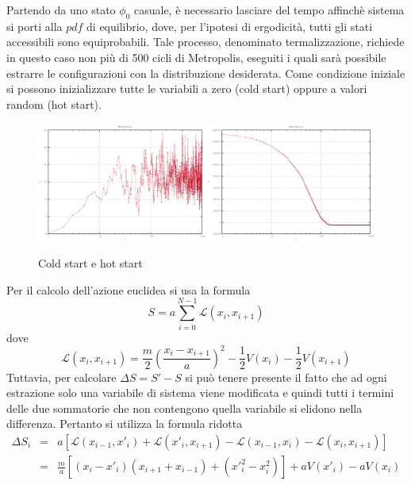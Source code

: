Partendo da uno stato $\phi_0$ casuale, è necessario lasciare del tempo affinchè sistema si porti alla $pdf$ di equilibrio, dove, per l'ipotesi di ergodicità, tutti gli stati accessibili sono equiprobabili. Tale processo, denominato termalizzazione, richiede in questo caso non più di 500 cicli di Metropolis, eseguiti i quali sarà possibile estrarre le configurazioni con la distribuzione desiderata. Come condizione iniziale si possono inizializzare tutte le variabili a zero (cold start) oppure a valori random (hot start).
\begin{figure}[H]
\centering
\includegraphics[width=0.5\textwidth]{action1}\includegraphics[width=0.5\textwidth]{action2}
\caption{Cold start e hot start}
\label{fig:action}
\end{figure}
Per il calcolo dell'azione euclidea si usa la formula
$$S = a\displaystyle\sum\limits_{i=0}^{N-1} \mathcal{L}(x_{i},x_{i+1})$$
dove
$$\mathcal{L}(x_{i},x_{i+1}) = \frac{m}{2}\left(\frac{x_{i}-x_{i+1}}{a}\right)^{2}-\frac{1}{2}V(x_{i})-\frac{1}{2}V(x_{i+1})$$
Tuttavia, per calcolare $\Delta S = S'-S$ si può tenere presente il fatto che ad ogni estrazione solo una variabile di sistema viene modificata e quindi tutti i termini delle due sommatorie che non contengono quella variabile si elidono nella differenza. Pertanto si utilizza la formula ridotta
\begin{eqnarray*}
 \Delta S_i &=& a[\mathcal{L}(x_{i-1},x'_{i})+\mathcal{L}(x'_{i},x_{i+1})-\mathcal{L}(x_{i-1},x_{i})-\mathcal{L}(x_{i},x_{i+1})]\\
   &=& \tfrac{m}{a}[(x_{i}-x'_{i})(x_{i+1}+x_{i-1})+(x'^2_i-x^2_i)]+aV(x'_i)-aV(x_i)
\end{eqnarray*}


